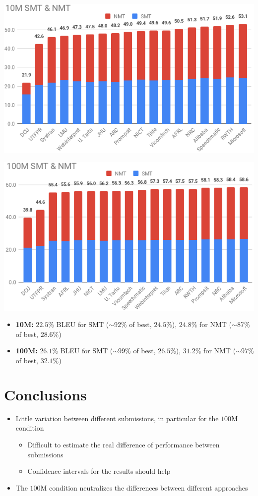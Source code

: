 \documentclass[a0]{sciposter}
\begin{document}
\begin{multicols*}{2}
\begin{center}
\includegraphics[width=0.85\columnwidth]{assets/10M_crop.png}

\includegraphics[width=0.85\columnwidth]{assets/100M_crop.png}
\end{center}

\begin{itemize}
  \item {\bf 10M:} $22.5\%$ BLEU for SMT ($\sim92\%$ of best, $24.5\%$), $24.8\%$ for NMT ($\sim87\%$ of best, $28.6\%$)
  \item {\bf 100M:} $26.1\%$ BLEU for SMT ($\sim99\%$ of best, $26.5\%$), $31.2\%$ for NMT ($\sim97\%$ of best, $32.1\%$)
\end{itemize} 


\section*{\Large Conclusions}
\begin{itemize}
  \item Little variation between different submissions, in particular for the $100$M condition
  \begin{itemize}
    \item Difficult to estimate the real difference of performance between submissions
    \item Confidence intervals for the results should help
  \end{itemize}
  \item The $100$M condition %
  neutralizes the differences between different approaches
\end{itemize}




\end{multicols*}
\end{document}
